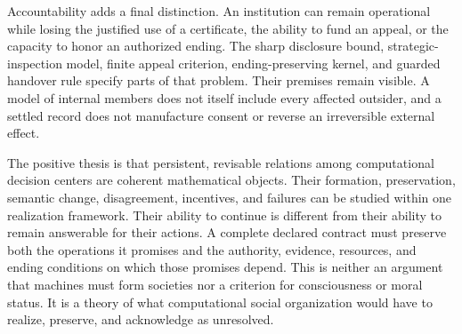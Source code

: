 Accountability adds a final distinction. An institution can remain operational while losing the justified use of a certificate, the ability to fund an appeal, or the capacity to honor an authorized ending. The sharp disclosure bound, strategic-inspection model, finite appeal criterion, ending-preserving kernel, and guarded handover rule specify parts of that problem. Their premises remain visible. A model of internal members does not itself include every affected outsider, and a settled record does not manufacture consent or reverse an irreversible external effect.

The positive thesis is that persistent, revisable relations among computational decision centers are coherent mathematical objects. Their formation, preservation, semantic change, disagreement, incentives, and failures can be studied within one realization framework. Their ability to continue is different from their ability to remain answerable for their actions. A complete declared contract must preserve both the operations it promises and the authority, evidence, resources, and ending conditions on which those promises depend. This is neither an argument that machines must form societies nor a criterion for consciousness or moral status. It is a theory of what computational social organization would have to realize, preserve, and acknowledge as unresolved.


